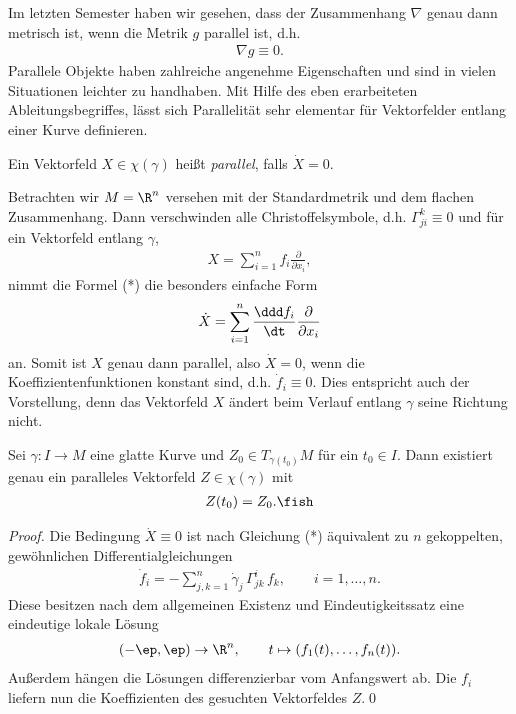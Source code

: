 \documentclass[%
	paper=a5,%
	fleqn,%
	DIV=18,%
	BCOR=0mm,
	fontsize=11pt,
	titlepage=false,%
	bibliography=totoc,
	DIV=18,%
	twoside=true,
	pdftitle=Riemannsche Geometrie,
	pdfauthor=Uwe Semmelmann,
	numbers=noendperiod]%
	{scrbook}
\begin{document}
Im letzten Semester haben wir gesehen, dass der Zusammenhang $\nabla$ genau dann
metrisch ist, wenn die Metrik $g$ parallel ist, d.h.
\begin{align*}
\nabla g \equiv 0.
\end{align*}
Parallele Objekte haben zahlreiche angenehme Eigenschaften und sind in vielen
Situationen leichter zu handhaben. Mit Hilfe des eben erarbeiteten
Ableitungsbegriffes, lässt sich Parallelität sehr elementar für Vektorfelder
entlang einer Kurve definieren.

\begin{defn}
Ein Vektorfeld $X\in\chi(\gamma)$ heißt \emph{parallel}, falls $\dot{X} =
0$.\fish
\end{defn}

\begin{ex}
Betrachten wir $M=\R^n$ versehen mit der Standardmetrik und dem flachen
Zusammenhang. Dann verschwinden alle Christoffelsymbole, d.h. $\Gamma_{ji}^k
\equiv 0$ und für ein Vektorfeld entlang $\gamma$,
\begin{align*}
X = \sum_{i=1}^n f_i \frac{\partial}{\partial x_i},
\end{align*}
nimmt die Formel (*) die besonders einfache Form
\begin{align*}
\dot{X} = \sum_{i=1}^n \frac{\ddd f_i}{\dt} \frac{\partial}{\partial x_i}
\end{align*}
an. Somit ist $X$ genau dann parallel, also $\dot{X}  =0$, wenn die
Koeffizientenfunktionen konstant sind, d.h. $\dot{f}_i \equiv 0$. Dies
entspricht auch der Vorstellung, denn das Vektorfeld $X$ ändert beim Verlauf
entlang $\gamma$ seine Richtung nicht.\boxc
\end{ex}

\begin{lem}
Sei $\gamma: I\to M$ eine glatte Kurve und $Z_0\in T_{\gamma(t_0)}M$ für ein
$t_0\in I$. Dann existiert genau ein paralleles Vektorfeld $Z\in\chi(\gamma)$
mit
\begin{align*}
Z(t_0) = Z_0.\fish 
\end{align*}
\end{lem}
\begin{proof}
Die Bedingung $\dot{X}\equiv 0$ ist nach Gleichung (*) äquivalent zu $n$
gekoppelten, gewöhnlichen Differentialgleichungen
\begin{align*}
\dot{f}_i = - \sum_{j,k=1}^n \dot{\gamma}_j\, \Gamma_{jk}^i\, f_k ,\qquad i =
1,\ldots,n.
\end{align*}
Diese besitzen nach dem allgemeinen Existenz und Eindeutigkeitssatz eine
eindeutige lokale Lösung
\begin{align*}
(-\ep,\ep)\to \R^n,\qquad t\mapsto (f_1(t),\ldots,f_n(t)).
\end{align*}
Außerdem hängen die Lösungen differenzierbar vom Anfangswert ab. Die $f_i$
liefern nun die Koeffizienten des gesuchten Vektorfeldes $Z$.\qed
\end{proof}
\end{document}
